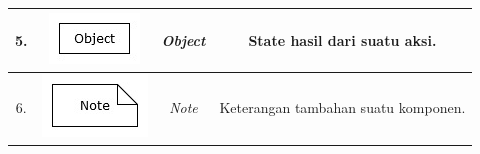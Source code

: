 \begin{table}[htbp]
\begin{center}
\begin{tabular}{|c|c|c|c| }
            5. & \begin{minipage}{.2\textwidth}
                \includegraphics[width=\linewidth]{bab2/gambar/uml/object.jpg}
            \end{minipage} & \textit{Object}  & State hasil dari suatu aksi.              \\ \hline

            6. & \begin{minipage}{.2\textwidth}
                \includegraphics[width=\linewidth]{bab2/gambar/uml/note.jpg}
            \end{minipage} & \textit{Note}    & Keterangan tambahan suatu komponen.       \\ \hline
        \end{tabular}
    \end{center}
\end{table}